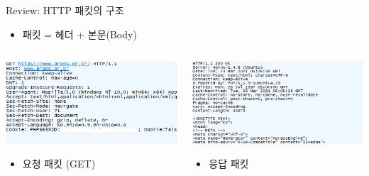 \documentclass{beamer}
\begin{document}
    \begin{frame}{Review: HTTP 패킷의 구조}
        \begin{itemize}
            \item 패킷 = 헤더 + 본문(Body)
        \end{itemize}
        \begin{columns}
            \begin{column}{.5\textwidth}
                \begin{center}
                    \includegraphics[width=\textwidth]{Images/request_http.png} 
                \end{center}
                
                \begin{itemize}
                    \item 요청 패킷 (GET)
                \end{itemize}                
            \end{column}
            \begin{column}{.5\textwidth}
                \begin{center}
                    \includegraphics[width=\textwidth]{Images/response_http.png} 
                \end{center}
                \begin{itemize}
                    \item 응답 패킷
                \end{itemize}
            \end{column}
        \end{columns}
    \end{frame}
\end{document}
